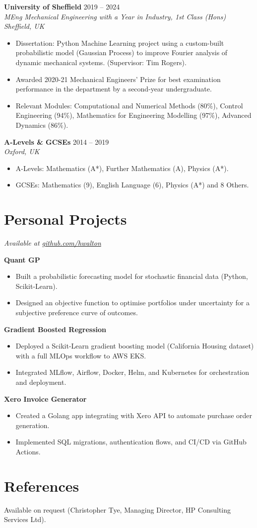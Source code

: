 \documentclass[a4paper,10pt]{article}
\newcommand{\resumeSubheading}[4]{
  \vspace{1pt}\textbf{#1} \hfill #2 \\
  \textit{#3} \hfill \textit{#4}
}
\newcommand{\resumeItem}[1]{\item{#1}}
\newcommand{\resumeItemListStart}{\begin{itemize}[leftmargin=*,itemsep=0pt,parsep=0pt]}
\newcommand{\resumeItemListEnd}{\end{itemize}\vspace{-3pt}}
\begin{document}
\resumeSubheading{University of Sheffield}{2019 -- 2024}{MEng Mechanical Engineering with a Year in Industry, 1st Class (Hons)}{Sheffield, UK}
\resumeItemListStart
  \resumeItem{Dissertation: Python Machine Learning project using a custom-built probabilistic model
(Gaussian Process) to improve Fourier analysis of dynamic mechanical systems. (Supervisor: Tim Rogers).}
  \resumeItem{Awarded 2020-21 Mechanical Engineers' Prize for best examination performance in the department by a second-year undergraduate.}
  \resumeItem{Relevant Modules: Computational and Numerical Methods (80\%), Control Engineering (94\%), Mathematics for Engineering Modelling (97\%), Advanced Dynamics (86\%).}
\resumeItemListEnd

\resumeSubheading{A-Levels \& GCSEs}{2014 -- 2019}{}{Oxford, UK}

\vspace{-2em}

\resumeItemListStart
  \resumeItem{A-Levels: Mathematics (A*), Further Mathematics (A), Physics (A*).}
  \resumeItem{GCSEs: Mathematics (9), English Language (6), Physics (A*) and 8 Others.}
\resumeItemListEnd

\section{Personal Projects}
\hfill\textit{Available at \href{https://github.com/hwalton}{github.com/hwalton}}

\textbf{Quant GP}
\resumeItemListStart
  \resumeItem{Built a probabilistic forecasting model for stochastic financial data (Python, Scikit-Learn).}
  \resumeItem{Designed an objective function to optimise portfolios under uncertainty for a subjective preference curve of outcomes.}
\resumeItemListEnd

\textbf{Gradient Boosted Regression}
\resumeItemListStart
  \resumeItem{Deployed a Scikit-Learn gradient boosting model (California Housing dataset) with a full MLOps workflow to AWS EKS.}
  \resumeItem{Integrated MLflow, Airflow, Docker, Helm, and Kubernetes for orchestration and deployment.}
\resumeItemListEnd

\textbf{Xero Invoice Generator}
\resumeItemListStart
  \resumeItem{Created a Golang app integrating with Xero API to automate purchase order generation.}
  \resumeItem{Implemented SQL migrations, authentication flows, and CI/CD via GitHub Actions.}
\resumeItemListEnd

\section{References}
Available on request (Christopher Tye, Managing Director, HP Consulting Services Ltd).
\end{document}
